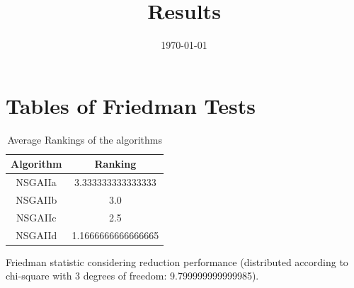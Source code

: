 \documentclass{article}
\title{Results}
\author{}
\date{\today}
\begin{document}
\oddsidemargin 0in \topmargin 0in\maketitle
\section{Tables of Friedman Tests}
\begin{table}[!htp]
\centering
\caption{Average Rankings of the algorithms
}\begin{tabular}{c|c}
Algorithm&Ranking\\
\hline
NSGAIIa&3.333333333333333\\
NSGAIIb&3.0\\
NSGAIIc&2.5\\
NSGAIId&1.1666666666666665\\
\end{tabular}
\end{table}


Friedman statistic considering reduction performance (distributed according to chi-square with 3 degrees of freedom: 9.799999999999985).
\end{document}
